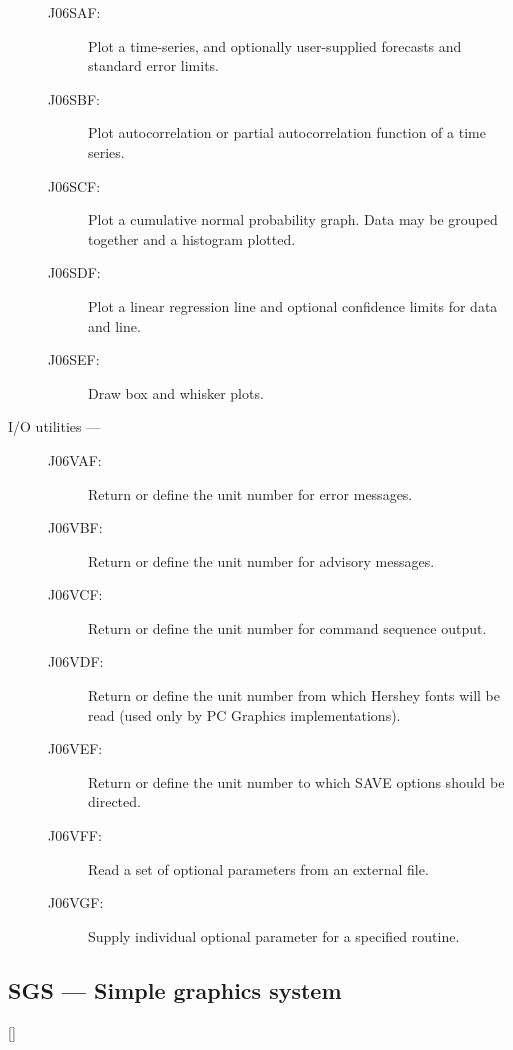 \begin{description}
\begin{description}
\item [J06SAF:]  Plot a time-series, and optionally user-supplied forecasts and standard error limits.
\item [J06SBF:]  Plot autocorrelation or partial autocorrelation function of a time series.
\item [J06SCF:]  Plot a cumulative normal probability graph. Data may be grouped together and a histogram plotted.
\item [J06SDF:]  Plot a linear regression line and optional confidence limits for data and line.
\item [J06SEF:]  Draw box and whisker plots.
\end{description}

\item [I/O utilities ---]

\begin{description}
\item [J06VAF:]  Return or define the unit number for error messages.
\item [J06VBF:]  Return or define the unit number for advisory messages.
\item [J06VCF:]  Return or define the unit number for command sequence output.
\item [J06VDF:]  Return or define the unit number from which Hershey fonts will be read (used only by PC Graphics implementations).
\item [J06VEF:]  Return or define the unit number to which SAVE options should be directed.
\item [J06VFF:]  Read a set of optional parameters from an external file.
\item [J06VGF:]  Supply individual optional parameter for a specified routine.
\end{description}

\end{description}

\newpage

\subsection{SGS --- Simple graphics system}

\vspace{-9mm}

\hfill []

\vspace{2mm}

